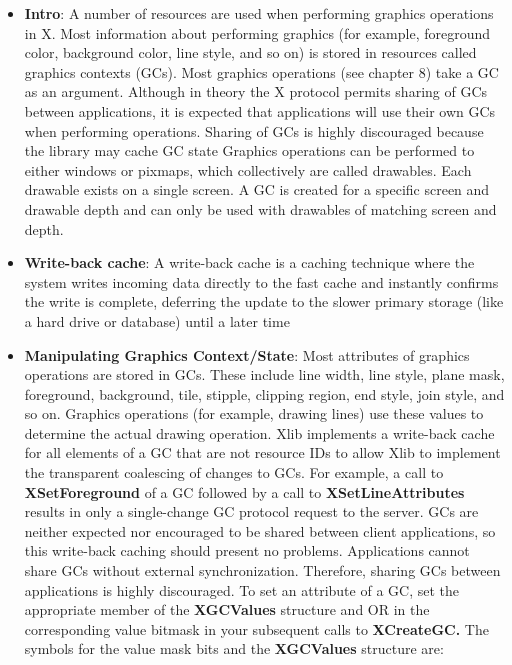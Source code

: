 \documentclass{report}
\begin{document}
    \pagebreak 
    \begin{itemize}
        \item \textbf{Intro}: A number of resources are used when performing graphics operations in X. Most information about performing graphics (for example, foreground color, background color, line style, and so on) is stored in resources called graphics contexts (GCs). Most graphics operations (see chapter 8) take a GC as an argument. Although in theory the X protocol permits sharing of GCs between applications, it is expected that applications will use their own GCs when performing operations. Sharing of GCs is highly discouraged because the library may cache GC state
            \bigbreak \noindent 
            Graphics operations can be performed to either windows or pixmaps, which collectively are called drawables. Each drawable exists on a single screen. A GC is created for a specific screen and drawable depth and can only be used with drawables of matching screen and depth.
        \item \textbf{Write-back cache}: A write-back cache is a caching technique where the system writes incoming data directly to the fast cache and instantly confirms the write is complete, deferring the update to the slower primary storage (like a hard drive or database) until a later time
        \item \textbf{Manipulating Graphics Context/State}: Most attributes of graphics operations are stored in GCs. These include line width, line style, plane mask, foreground, background, tile, stipple, clipping region, end style, join style, and so on. Graphics operations (for example, drawing lines) use these values to determine the actual drawing operation. 
            \bigbreak \noindent 
            Xlib implements a write-back cache for all elements of a GC that are not resource IDs to allow Xlib to implement the transparent coalescing of changes to GCs. For example, a call to \textbf{XSetForeground} of a GC followed by a call to \textbf{XSetLineAttributes} results in only a single-change GC protocol request to the server. GCs are neither expected nor encouraged to be shared between client applications, so this write-back caching should present no problems. Applications cannot share GCs without external synchronization. Therefore, sharing GCs between applications is highly discouraged.
            \bigbreak \noindent 
            To set an attribute of a GC, set the appropriate member of the \textbf{XGCValues} structure and OR in the corresponding value bitmask in your subsequent calls to \textbf{XCreateGC.} The symbols for the value mask bits and the \textbf{XGCValues} structure are:

\end{itemize}
\end{document}
